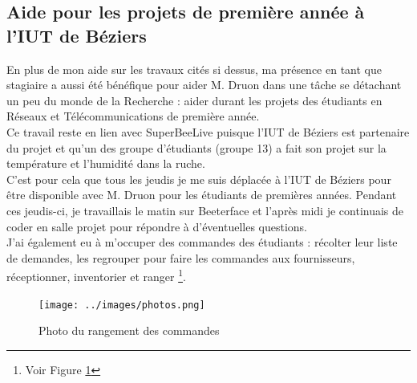 \documentclass[11pt,french,a4paper]{report}
\begin{document}
        \subsection{Aide pour les projets de première année à l'IUT de Béziers}
En plus de mon aide sur les travaux cités si dessus, ma présence en tant que stagiaire a aussi été bénéfique pour aider M. Druon 
dans une tâche se détachant un peu du monde de la Recherche : aider durant les projets des étudiants en Réseaux et Télécommunications 
de première année. \\
Ce travail reste en lien avec SuperBeeLive puisque l'IUT de Béziers est partenaire du projet et qu'un des groupe d'étudiants (groupe 13) 
a fait son projet sur la température et l'humidité dans la ruche. \\
C'est pour cela que tous les jeudis je me suis déplacée à l'IUT de Béziers pour être disponible avec M. Druon pour les étudiants de premières
années.
Pendant ces jeudis-ci, je travaillais le matin sur Beeterface et 
l'après midi je continuais de coder en salle projet pour répondre à d'éventuelles questions. \\
J'ai également eu à m'occuper des commandes des étudiants : récolter leur liste de demandes, les regrouper pour faire les commandes
aux fournisseurs, réceptionner, inventorier et ranger \footnote{Voir Figure \ref{photo_bureau}}.\\
\begin{figure}
    \centering
    \texttt{[image: ../images/photos.png]}
    \caption{Photo du rangement des commandes}
    \label{photo_bureau}
\end{figure}
    
\end{document}
